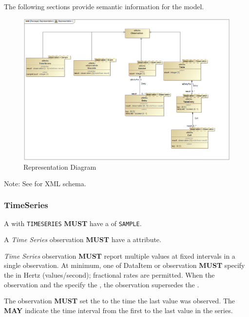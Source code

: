 The following sections provide semantic information for the  model.

\begin{figure}[ht]
  \centering
    \includegraphics[width=1.0\textwidth]{figures/Representation.png}
  \caption{Representation Diagram}
  \label{fig:Representation Diagram}
\end{figure}

\FloatBarrier


Note: See  for XML schema.


\subsubsection{TimeSeries}
\label{sec:TimeSeries}




A  with \texttt{TIME\textunderscore SERIES}  \textbf{MUST} have a  of \texttt{SAMPLE}.

A \textit{Time Series} \gls{observation} \textbf{MUST} have a  attribute.

\textit{Time Series} \gls{observation} \textbf{MUST} report multiple values at fixed intervals in a single \gls{observation}. At minimum, one of DataItem or \gls{observation} \textbf{MUST} specify the  in Hertz (values/second); fractional rates are permitted. When the \gls{observation} and the  specify the , the \gls{observation}  supersedes the .

The \gls{observation} \textbf{MUST} set the  to the time the last value was observed. The  \textbf{MAY} indicate the time interval from the first to the last value in the series.

